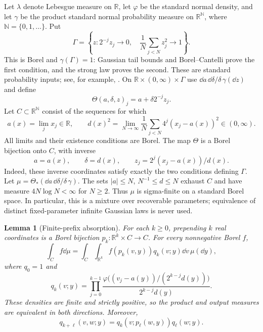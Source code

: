 \documentclass[11pt]{article}
\newtheorem{lemma}[theorem]{Lemma}
\theoremstyle{remark}\newtheorem{remark}[theorem]{Remark}
\newcommand{\R}{\mathbb R}\newcommand{\N}{\mathbb N}
\begin{document}
Let $\lambda$ denote Lebesgue measure on $\R$, let $\varphi$ be the standard
normal density, and let $\gamma$ be the product standard normal probability
measure on $\R^{\N}$, where $\N=\{0,1,\ldots\}$. Put
\[
 \Gamma=\left\{z:2^{-j}z_j\to0,\quad
 \frac1N\sum_{j<N}z_j^2\to1\right\}.
\]
This is Borel and $\gamma(\Gamma)=1$: Gaussian tail bounds and
Borel--Cantelli prove the first condition, and the strong law proves the
second. These are standard probability inputs; see, for example,
\cite{Kallenberg2021}. On $\R\times(0,\infty)\times\Gamma$ use
$\dd a\,\dd\delta/\delta\,\gamma(\dd z)$ and define
\[
 \Theta(a,\delta,z)_j=a+\delta2^{-j}z_j.
\]
Let $C\subset\R^{\N}$ consist of the sequences for which
\begin{equation}\label{eq:recover}
 a(x)=\lim_jx_j\in\R,\qquad
 d(x)^2=\lim_{N\to\infty}\frac1N\sum_{j<N}4^j(x_j-a(x))^2\in(0,\infty).
\end{equation}
All limits and their existence conditions are Borel. The map $\Theta$ is a
Borel bijection onto $C$, with inverse
\[
 a=a(x),\qquad\delta=d(x),\qquad
 z_j=2^j(x_j-a(x))/d(x).
\]
Indeed, these inverse coordinates satisfy exactly the two conditions defining
$\Gamma$. Let $\mu=\Theta_*(\dd a\,\dd\delta/\delta\,\gamma)$.
The sets $|a|\leq N$, $N^{-1}\leq d\leq N$ exhaust $C$ and have measure
$4N\log N<\infty$ for $N\geq2$. Thus $\mu$ is sigma-finite on a standard
Borel space. In particular, this is a mixture over recoverable parameters;
equivalence of distinct fixed-parameter infinite Gaussian laws is never used.

\begin{lemma}[Finite-prefix absorption]\label{lem:prefix}
For each $k\geq0$, prepending $k$ real coordinates is a Borel bijection
$p_k:\R^k\times C\to C$. For every nonnegative Borel $f$,
\begin{equation}\label{eq:prefix-integral}
 \int_C f\dd\mu=
 \int_C\int_{\R^k}f(p_k(v,y))q_k(v;y)\dd v\,\mu(\dd y),
\end{equation}
where $q_0=1$ and
\begin{equation}\label{eq:q}
 q_k(v;y)=\prod_{j=0}^{k-1}
 \frac{\varphi\big((v_j-a(y))/(2^{k-j}d(y))\big)}{2^{k-j}d(y)}.
\end{equation}
These densities are finite and strictly positive, so the product and output
measures are equivalent in both directions. Moreover,
\begin{equation}\label{eq:chain}
 q_{k+\ell}(v,w;y)=q_k(v;p_\ell(w,y))q_\ell(w;y).
\end{equation}
\end{lemma}
\end{document}
